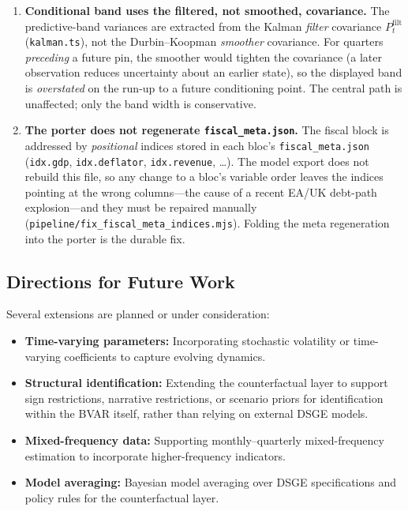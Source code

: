 \documentclass[11pt]{article}
\theoremstyle{definition}
\theoremstyle{remark}
\begin{document}
\begin{enumerate}
    or a degenerate pin set that pushed $\rho(M)\ge 1$ would return a
    \emph{confidently wrong} forecast from a diverged fixed point with no
    warning. A spectral-radius backstop is needed.
  \item \textbf{Conditional band uses the filtered, not smoothed,
    covariance.} The predictive-band variances are extracted from the
    Kalman \emph{filter} covariance $P^{\mathrm{filt}}_t$
    (\texttt{kalman.ts}), not the Durbin--Koopman \emph{smoother}
    covariance. For quarters \emph{preceding} a future pin, the smoother
    would tighten the covariance (a later observation reduces uncertainty
    about an earlier state), so the displayed band is \emph{overstated}
    on the run-up to a future conditioning point. The central path is
    unaffected; only the band width is conservative.
  \item \textbf{The porter does not regenerate \texttt{fiscal\_meta.json}.}
    The fiscal block is addressed by \emph{positional} indices stored in
    each bloc's \texttt{fiscal\_meta.json}
    (\texttt{idx.gdp}, \texttt{idx.deflator}, \texttt{idx.revenue}, \dots).
    The model export does not rebuild this file, so any change to a bloc's
    variable order leaves the indices pointing at the wrong columns---the
    cause of a recent EA/UK debt-path explosion---and they must be repaired
    manually (\texttt{pipeline/fix\_fiscal\_meta\_indices.mjs}). Folding the
    meta regeneration into the porter is the durable fix.
\end{enumerate}

\subsection{Directions for Future Work}

Several extensions are planned or under consideration:

\begin{itemize}
  \item \textbf{Time-varying parameters:} Incorporating stochastic
    volatility or time-varying coefficients
    \citep[e.g.,][]{simszha1998} to capture evolving dynamics.

  \item \textbf{Structural identification:} Extending the
    counterfactual layer to support sign restrictions, narrative
    restrictions, or scenario priors \citep{FarkasJakab2026} for
    identification within the BVAR itself, rather than relying on
    external DSGE models.

  \item \textbf{Mixed-frequency data:} Supporting monthly--quarterly
    mixed-frequency estimation to incorporate higher-frequency
    indicators.

  \item \textbf{Model averaging:} Bayesian model averaging over
    DSGE specifications and policy rules for the counterfactual
    layer.
\end{itemize}
\end{document}
